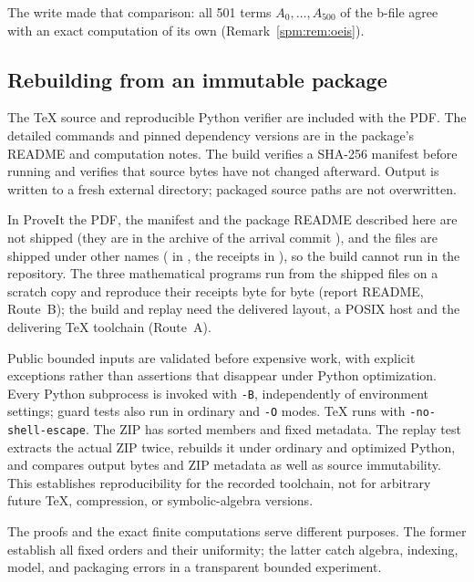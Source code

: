 \begin{writenote}
The write made that comparison: all 501 terms $A_0,\ldots,A_{500}$ of the
b-file agree with an exact computation of its own
(Remark~\ref{spm:rem:oeis}).
\end{writenote}

\subsection{Rebuilding from an immutable package}
The TeX source and reproducible Python verifier are included with the PDF. The detailed commands and pinned dependency versions are in the package's README and computation notes. The build verifies a SHA-256 manifest before running and verifies that source bytes have not changed afterward. Output is written to a fresh external directory; packaged source paths are not overwritten.

\begin{writenote}
In ProveIt the PDF, the manifest and the package README described here are
not shipped (they are in the archive of the arrival commit
), and the files are shipped under other names
( in , the receipts in ), so the
build cannot run in the repository. The three mathematical programs run
from the shipped files on a scratch copy and reproduce their receipts byte
for byte (report README, Route~B); the build and replay need the delivered
layout, a POSIX host and the delivering TeX toolchain (Route~A).
\end{writenote}

Public bounded inputs are validated before expensive work, with explicit exceptions rather than assertions that disappear under Python optimization. Every Python subprocess is invoked with \texttt{-B}, independently of environment settings; guard tests also run in ordinary and \texttt{-O} modes. TeX runs with \texttt{-no-shell-escape}. The ZIP has sorted members and fixed metadata. The replay test extracts the actual ZIP twice, rebuilds it under ordinary and optimized Python, and compares output bytes and ZIP metadata as well as source immutability. This establishes reproducibility for the recorded toolchain, not for arbitrary future TeX, compression, or symbolic-algebra versions.

The proofs and the exact finite computations serve different purposes. The former establish all fixed orders and their uniformity; the latter catch algebra, indexing, model, and packaging errors in a transparent bounded experiment.

